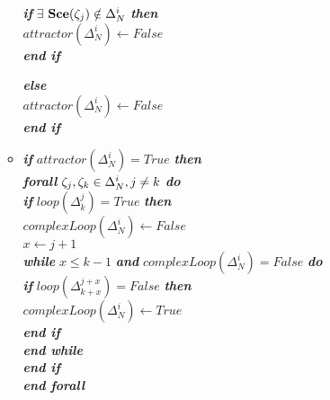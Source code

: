 \begin{algorithm}[!h]
\begin{itemize}
\begin{itemize}
							\hspace{1.2cm} \textbf{\textit{if}} $\exists$ $\mathbf{Sce}(\zeta_j) \notin  \Delta_N^i$ \textbf{\textit{then}} \\ \hspace{1.7cm} $attractor(\Delta_N^i) \longleftarrow False$ \\
							\hspace{1.2cm} \textbf{\textit{end if}} 
							
							\textbf{\textit{else}} \\
							\hspace{0.7cm} $attractor(\Delta_N^i) \longleftarrow False$ \\
							\textbf{\textit{end if}} 
														
					\item[] \textbf{\textit{if}} $attractor(\Delta_N^i) = True$ \textbf{\textit{then}}\\
						\hspace{0.7cm} \textbf{\textit{forall}} $\zeta_j, \zeta_k \in \Delta_N^i, j \neq k$ \textbf{\textit{do}} \\								
								\hspace{1.2cm} \textbf{\textit{if}} $loop(\Delta_k^j) = True$ \textbf{\textit{then}}\\
									\hspace{1.7cm} $complexLoop(\Delta_N^i) \longleftarrow False$ \\
									\hspace{1.7cm} $x \longleftarrow j+1$ \\									
									\hspace{1.7cm} \textbf{\textit{while}} $x \leq k-1 $ \textbf{\textit{and}} $complexLoop(\Delta_N^i) = False$ \textbf{\textit{do}} \\	
									
										\hspace{2.1cm} \textbf{\textit{if}} $loop(\Delta_{k+x}^{j+x}) = False$ \textbf{\textit{then}}\\
											\hspace{2.5cm} $complexLoop(\Delta_N^i) \longleftarrow True$ \\
										\hspace{2.1cm} \textbf{\textit{end if}} \\
									\hspace{1.7cm} \textbf{\textit{end while}} \\
								\hspace{1.2cm} \textbf{\textit{end if}} \\
						\hspace{0.7cm} \textbf{\textit{end forall}} 	\\


\end{itemize}
\end{itemize}
\end{algorithm}
